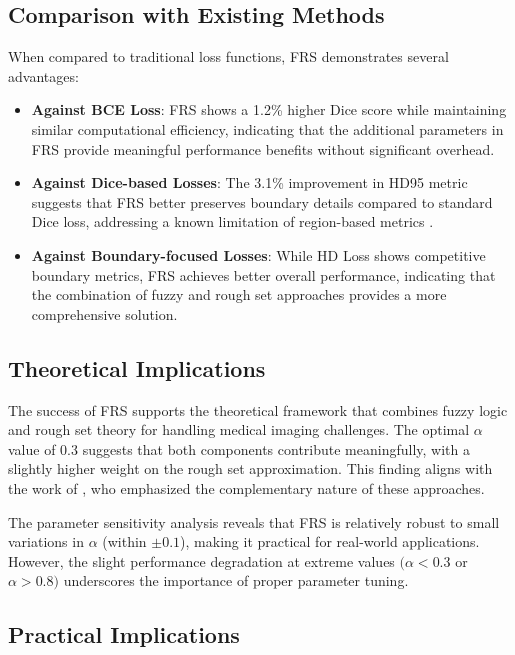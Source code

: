 \documentclass[review]{elsarticle}
\begin{document}
\subsection{Comparison with Existing Methods}

When compared to traditional loss functions, FRS demonstrates several advantages:

\begin{itemize}
    \item \textbf{Against BCE Loss}: FRS shows a 1.2\% higher Dice score while maintaining similar computational efficiency, indicating that the additional parameters in FRS provide meaningful performance benefits without significant overhead.
    
    \item \textbf{Against Dice-based Losses}: The 3.1\% improvement in HD95 metric suggests that FRS better preserves boundary details compared to standard Dice loss, addressing a known limitation of region-based metrics \cite{Zhao2020}.
    
    \item \textbf{Against Boundary-focused Losses}: While HD Loss \cite{karimi2019reducing} shows competitive boundary metrics, FRS achieves better overall performance, indicating that the combination of fuzzy and rough set approaches provides a more comprehensive solution.
\end{itemize}

\subsection{Theoretical Implications}

The success of FRS supports the theoretical framework that combines fuzzy logic and rough set theory for handling medical imaging challenges. The optimal \(\alpha\) value of 0.3 suggests that both components contribute meaningfully, with a slightly higher weight on the rough set approximation. This finding aligns with the work of \cite{Ganivada2021}, who emphasized the complementary nature of these approaches.

The parameter sensitivity analysis reveals that FRS is relatively robust to small variations in \(\alpha\) (within \(\pm 0.1\)), making it practical for real-world applications. However, the slight performance degradation at extreme values \((\alpha < 0.3\) or \(\alpha > 0.8)\) underscores the importance of proper parameter tuning.

\subsection{Practical Implications}
\end{document}
